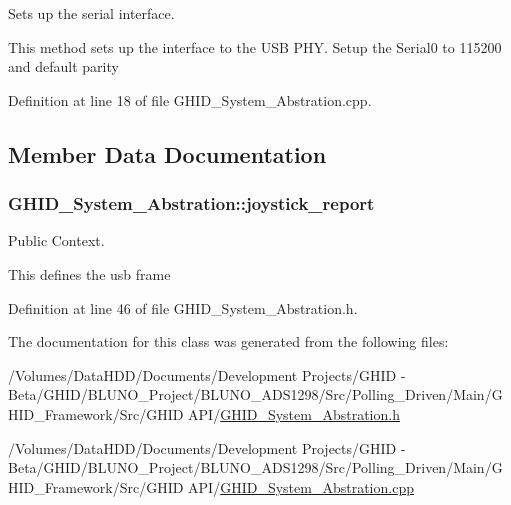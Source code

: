 \-Sets up the serial interface. 

\-This method sets up the interface to the \-U\-S\-B \-P\-H\-Y. \-Setup the \-Serial0 to 115200 and default parity 

\-Definition at line 18 of file \-G\-H\-I\-D\-\_\-\-System\-\_\-\-Abstration.\-cpp.



\subsection{\-Member \-Data \-Documentation}
\hypertarget{class_g_h_i_d___system___abstration_a7b6a61d7f6516c004300bccae5145ca4}{
\subsubsection[{joystick\-\_\-report}]{ {\bf \-G\-H\-I\-D\-\_\-\-System\-\_\-\-Abstration\-::joystick\-\_\-report}}}\label{class_g_h_i_d___system___abstration_a7b6a61d7f6516c004300bccae5145ca4}


\-Public \-Context. 

\-This defines the usb frame 

\-Definition at line 46 of file \-G\-H\-I\-D\-\_\-\-System\-\_\-\-Abstration.\-h.



\-The documentation for this class was generated from the following files\-:\begin{DoxyCompactItemize}
\item 
/\-Volumes/\-Data\-H\-D\-D/\-Documents/\-Development Projects/\-G\-H\-I\-D -\/ Beta/\-G\-H\-I\-D/\-B\-L\-U\-N\-O\-\_\-\-Project/\-B\-L\-U\-N\-O\-\_\-\-A\-D\-S1298/\-Src/\-Polling\-\_\-\-Driven/\-Main/\-G\-H\-I\-D\-\_\-\-Framework/\-Src/\-G\-H\-I\-D A\-P\-I/\hyperlink{_g_h_i_d___system___abstration_8h}{\-G\-H\-I\-D\-\_\-\-System\-\_\-\-Abstration.\-h}\item 
/\-Volumes/\-Data\-H\-D\-D/\-Documents/\-Development Projects/\-G\-H\-I\-D -\/ Beta/\-G\-H\-I\-D/\-B\-L\-U\-N\-O\-\_\-\-Project/\-B\-L\-U\-N\-O\-\_\-\-A\-D\-S1298/\-Src/\-Polling\-\_\-\-Driven/\-Main/\-G\-H\-I\-D\-\_\-\-Framework/\-Src/\-G\-H\-I\-D A\-P\-I/\hyperlink{_g_h_i_d___system___abstration_8cpp}{\-G\-H\-I\-D\-\_\-\-System\-\_\-\-Abstration.\-cpp}\end{DoxyCompactItemize}
